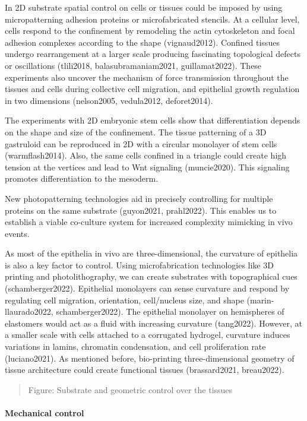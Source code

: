 \documentclass[
]{article}
\begin{document}
In 2D substrate spatial control on cells or tissues could be imposed by
using micropatterning adhesion proteins or microfabricated stencils. At
a cellular level, cells respond to the confinement by remodeling the
actin cytoskeleton and focal adhesion complexes according to the shape
(vignaud2012). Confined tissues undergo rearrangement at a larger scale
producing fascinating topological defects or oscillations (tlili2018,
balasubramaniam2021, guillamat2022). These experiments also uncover the
mechanism of force transmission throughout the tissues and cells during
collective cell migration, and epithelial growth regulation in two
dimensions (nelson2005, vedula2012, deforet2014).

The experiments with 2D embryonic stem cells show that differentiation
depends on the shape and size of the confinement. The tissue patterning
of a 3D gastruloid can be reproduced in 2D with a circular monolayer of
stem cells (warmflash2014). Also, the same cells confined in a triangle
could create high tension at the vertices and lead to Wnt signaling
(muncie2020). This signaling promotes differentiation to the mesoderm.

New photopatterning technologies aid in precisely controlling for
multiple proteins on the same substrate (guyon2021, prahl2022). This
enables us to establish a viable co-culture system for increased
complexity mimicking in vivo events.

As most of the epithelia in vivo are three-dimensional, the curvature of
epithelia is also a key factor to control. Using microfabrication
technologies like 3D printing and photolithography, we can create
substrates with topographical cues (schamberger2022). Epithelial
monolayers can sense curvature and respond by regulating cell migration,
orientation, cell/nucleus size, and shape (marin-llaurado2022,
schamberger2022). The epithelial monolayer on hemispheres of elastomers
would act as a fluid with increasing curvature (tang2022). However, at a
smaller scale with cells attached to a corrugated hydrogel, curvature
induces variations in lamins, chromatin condensation, and cell
proliferation rate (luciano2021). As mentioned before, bio-printing
three-dimensional geometry of tissue architecture could create
functional tissues (brassard2021, breau2022).

\begin{quote}
Figure: Substrate and geometric control over the tissues
\end{quote}

\hypertarget{mechanical-control}{%
\paragraph{Mechanical control}\label{mechanical-control}}
\end{document}
